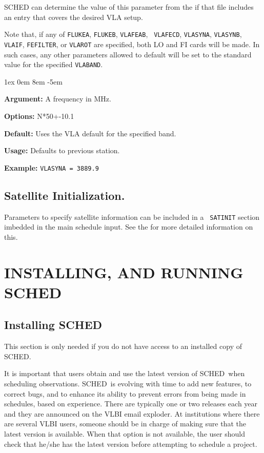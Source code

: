 \documentclass{report}
\newcommand{\sched}{{\sc SCHED}}
\newcommand{\schedb}{{\sc SCHED~}}
\newcommand{\rcwbox}[5]{
  \begin{list}{}{\parsep 1ex  \itemsep 0em
                 \leftmargin 8em  \itemindent -5em }
    \item {\bf Argument:} #1
    \item {\bf Options:}  #2
    \item {\bf Default:}  #3
    \item {\bf Usage:}    #4
    \item {\bf Example:}  #5
  \end{list}
}
\begin{document}
SCHED can determine the value of this parameter from the
 if that file includes
an entry that covers the desired VLA setup.

Note that, if any of {\tt FLUKEA}, {\tt FLUKEB}, {\tt VLAFEAB}, {\tt
VLAFECD}, {\tt VLASYNA}, {\tt VLASYNB}, {\tt VLAIF}, {\tt FEFILTER},
or {\tt VLAROT} are specified, both LO and FI cards will be made.  In
such cases, any other parameters allowed to default will be set to the
standard value for the specified {\tt VLABAND}.

\rcwbox
{A frequency in MHz.}
{N*50+-10.1}
{Uses the VLA default for the specified band.}
{Defaults to previous station.}
{{\tt VLASYNA = 3889.9}}

\section{\label{SEC:SATINIT}Satellite Initialization.}

Parameters to specify satellite information can be included in a {\tt
SATINIT} section imbedded in the main schedule input.  See the
 for more detailed
information on this.


\chapter{\label{CHP:SYSTEM}INSTALLING, AND RUNNING SCHED}

\section{\label{SEC:INSTALL}Installing SCHED}

This section is only needed if you do not have access to an installed
copy of \sched.

It is important that users obtain and use the latest version of
\schedb when scheduling observations.  \schedb is evolving with time
to add new features, to correct bugs, and to enhance its ability to
prevent errors from being made in schedules, based on experience.
There are typically one or two releases each year and they are
announced on the VLBI email exploder.  At institutions where there are
several VLBI users, someone should be in charge of making sure that
the latest version is available.  When that option is not available,
the user should check that he/she has the latest version before
attempting to schedule a project.
\end{document}
